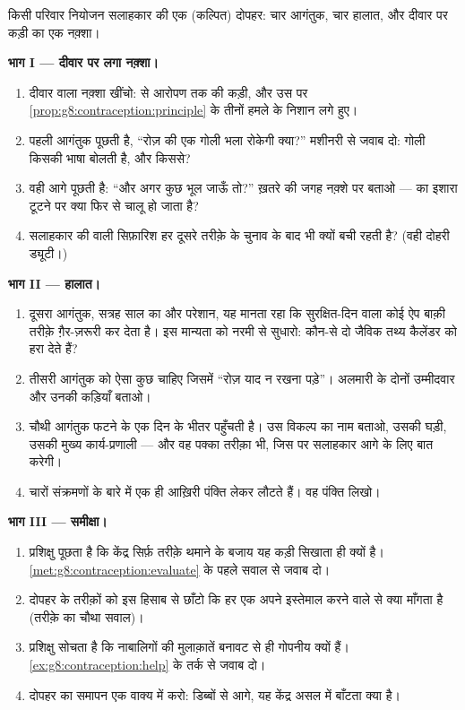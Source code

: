 \begin{problem}\label{pb:g8:contraception:1}
किसी परिवार नियोजन सलाहकार की एक (कल्पित) दोपहर: चार आगंतुक, चार
हालात, और दीवार पर कड़ी का एक नक़्शा।

\medskip\noindent\textbf{भाग I --- दीवार पर लगा नक़्शा।}
\begin{enumerate}
  \item दीवार वाला नक़्शा खींचो:  से आरोपण तक की कड़ी, और उस
        पर \cref{prop:g8:contraception:principle} के तीनों हमले के
        निशान लगे हुए।
  \item पहली आगंतुक पूछती है, ``रोज़ की एक गोली भला रोकेगी क्या?''
        मशीनरी से जवाब दो: गोली किसकी भाषा बोलती है, और किससे?
  \item वही आगे पूछती है: ``और अगर कुछ भूल जाऊँ तो?'' ख़तरे की जगह
        नक़्शे पर बताओ ---  का इशारा टूटने पर क्या फिर से चालू
        हो जाता है?
  \item सलाहकार की  वाली सिफ़ारिश हर दूसरे तरीक़े के चुनाव के बाद
        भी क्यों बची रहती है? (वही दोहरी ड्यूटी।)
\end{enumerate}

\medskip\noindent\textbf{भाग II --- हालात।}
\begin{enumerate}[resume]
  \item दूसरा आगंतुक, सत्रह साल का और परेशान, यह मानता रहा कि
        सुरक्षित-दिन वाला कोई ऐप बाक़ी तरीक़े ग़ैर-ज़रूरी कर देता है।
        इस मान्यता को नरमी से सुधारो: कौन-से दो जैविक तथ्य कैलेंडर को
        हरा देते हैं?
  \item तीसरी आगंतुक को ऐसा कुछ चाहिए जिसमें ``रोज़ याद न रखना पड़े''।
        अलमारी के दोनों उम्मीदवार और उनकी कड़ियाँ बताओ।
  \item चौथी आगंतुक  फटने के एक दिन के भीतर पहुँचती है। उस विकल्प
        का नाम बताओ, उसकी घड़ी, उसकी मुख्य कार्य-प्रणाली --- और वह
        पक्का तरीक़ा भी, जिस पर सलाहकार आगे के लिए बात करेगी।
  \item चारों संक्रमणों के बारे में एक ही आख़िरी पंक्ति लेकर लौटते
        हैं। वह पंक्ति लिखो।
\end{enumerate}

\medskip\noindent\textbf{भाग III --- समीक्षा।}
\begin{enumerate}[resume]
  \item प्रशिक्षु पूछता है कि केंद्र सिर्फ़ तरीक़े थमाने के बजाय यह
        कड़ी सिखाता ही क्यों है।
        \cref{met:g8:contraception:evaluate} के पहले सवाल से जवाब
        दो।
  \item दोपहर के तरीक़ों को इस हिसाब से छाँटो कि हर एक अपने इस्तेमाल
        करने वाले से क्या माँगता है (तरीक़े का चौथा सवाल)।
  \item प्रशिक्षु सोचता है कि नाबालिगों की मुलाक़ातें बनावट से ही
        गोपनीय क्यों हैं। \cref{ex:g8:contraception:help} के तर्क से
        जवाब दो।
  \item दोपहर का समापन एक वाक्य में करो: डिब्बों से आगे, यह केंद्र
        असल में बाँटता क्या है।
\end{enumerate}
\end{problem}
